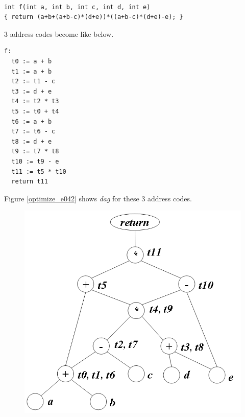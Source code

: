 \begin{Example}
\label{optimize_e041}
\begin{verbatim}

int f(int a, int b, int c, int d, int e)
{ return (a+b+(a+b-c)*(d+e))*((a+b-c)*(d+e)-e); }
\end{verbatim}
3 address codes become like below.
\begin{verbatim}
f:
  t0 := a + b
  t1 := a + b
  t2 := t1 - c
  t3 := d + e
  t4 := t2 * t3
  t5 := t0 + t4
  t6 := a + b
  t7 := t6 - c
  t8 := d + e
  t9 := t7 * t8
  t10 := t9 - e
  t11 := t5 * t10
  return t11
\end{verbatim}
Figure \ref{optimize_e042} shows {\em dag} for these 3 address codes.
\begin{figure}[htbp]
\begin{center}
\begin{htmlonly}
\includegraphics[width=1.051\linewidth,height=1.0\linewidth]{opt022.png}
\end{htmlonly}
\begin{latexonly}

\end{latexonly}
\end{center}
\end{figure}
\end{Example}
